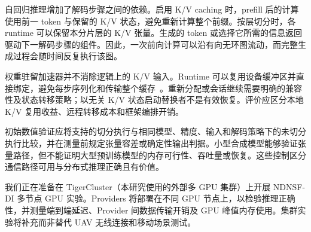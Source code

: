 自回归推理增加了解码步骤之间的依赖。启用 K/V caching 时，prefill 后的计算使用前一 token 与保留的 K/V 状态，避免重新计算整个前缀。按层切分时，各 runtime 可以保留本分片层的 K/V 张量。生成的 token 或选择它所需的信息返回驱动下一解码步骤的组件。因此，一次前向计算可以沿有向无环图流动，而完整生成过程会随时间反复执行该图。

权重驻留加速器并不消除逻辑上的 K/V 输入。Runtime 可以复用设备缓冲区并直接绑定，避免每步序列化和传输整个缓存~\cite{ortkvcache}。重新分配或会话继续需要明确的兼容性及状态转移策略；以无关 K/V 状态启动替换者不是有效恢复。评价应区分本地 K/V 复用收益、远程转移成本和框架编排开销。

初始数值验证应将支持的切分执行与相同模型、精度、输入和解码策略下的未切分执行比较，并在测量前规定张量容差或确定性输出判据。小型合成模型能够验证张量路径，但不能证明大型预训练模型的内存可行性、吞吐量或恢复。这些控制区分通信路径可用与分布式推理正确且有价值。

我们正在准备在 TigerCluster（本研究使用的外部多 GPU 集群）上开展 NDNSF-DI 多节点 GPU 实验。Providers 将部署在不同 GPU 节点上，以检验推理正确性，并测量端到端延迟、Provider 间数据传输开销及 GPU 峰值内存使用。集群实验将补充而非替代 UAV 无线连接和移动场景测试。
